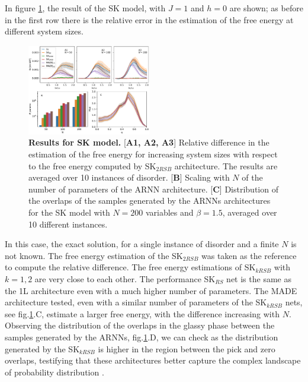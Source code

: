 \documentclass[aps,physrev,10pt,floatfix,reprint]{revtex4-2}
\begin{document}
In figure \ref{fig:SK}, the result of the SK model, with $J=1$ and $h=0$ are shown; as before in the first row there is the relative error in the estimation of the free energy at different system sizes. 
\begin{figure}[h]
    \centering 
    \includegraphics[width=0.48\textwidth]{img/SK_res.pdf}
    \caption{\textbf{Results for SK model.} [\textbf{A1, A2, A3}] Relative difference in the estimation of the free energy for increasing system sizes with respect to the free energy computed by SK$_{2RSB}$ architecture. The results are averaged over 10 instances of disorder. [\textbf{B}] Scaling with $N$ of the number of parameters of the ARNN architecture. [\textbf{C}] Distribution of the overlaps of the samples generated by the ARNNs architectures for the SK model with $N=200$ variables and $\beta=1.5$, averaged over 10 different instances.}
    \label{fig:SK}
\end{figure}
In this case, the exact solution, for a single instance of disorder and a finite $N$ is not known. The free energy estimation of the SK$_{2RSB}$ was taken as the reference to compute the relative difference. The free energy estimations of SK$_{kRSB}$ with $k=1,2$ are very close to each other.
The performance SK$_{RS}$ net is the same as the 1L architecture even with a much higher number of parameters. The MADE architecture tested, even with a similar number of parameters of the SK$_{kRSB}$ nets, see fig.\ref{fig:SK}.C, estimate a larger free energy, with the difference increasing with $N$. Observing the distribution of the overlaps in the glassy phase between the samples generated by the ARNNs, fig.\ref{fig:SK}.D, we can check as the distribution generated by the SK$_{kRSB}$ is higher in the region between the pick and zero overlaps, testifying that these architectures better capture the complex landscape of probability distribution \cite{PhysRevLett.51.1206}.
\end{document}
